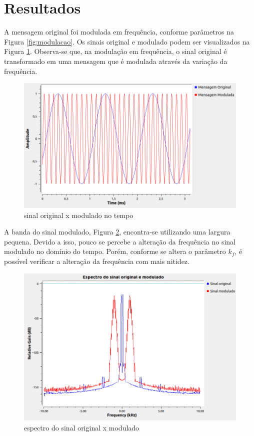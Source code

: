 \section{Resultados}
A mensagem original foi modulada em frequência, conforme parâmetros na Figura \ref{fig:modulacao}. Os sinais original e modulado podem ser visualizados na Figura \ref{fig:resul_01}. Observa-se que, na modulação em frequência, o sinal original é transformado em uma mensagem que é modulada através da variação da frequência.


\begin{figure}[!htb]
    \centering
    \includegraphics[width=1\linewidth]{Imagens/fig:resul_01.png}
    \caption{sinal original x modulado no tempo}
    \label{fig:resul_01}
\end{figure}

A banda do sinal modulado, Figura \ref{fig:resul_02}, encontra-se utilizando uma largura pequena. Devido a isso, pouco se percebe a alteração da frequência no sinal modulado no domínio do tempo. Porém, conforme se altera o parâmetro $k_f$, é possível verificar a alteração da frequência com mais nitidez. 

\begin{figure}[!htb]
    \centering
    \includegraphics[width=1\linewidth]{Imagens/fig:resul_02.png}
    \caption{espectro do sinal original x modulado}
    \label{fig:resul_02}
\end{figure}


